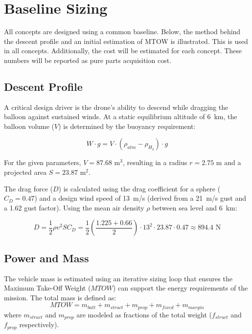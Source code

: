 \section{Baseline Sizing}

All concepts are designed using a common baseline. Below, the method behind the descent profile and an initial estimation of MTOW is illustrated. This is used in all concepts. Additionally, the cost will be estimated for each concept. These numbers will be reported as pure parts acquisition cost.
\subsection*{Descent Profile}

A critical design driver is the drone's ability to descend while dragging the balloon against sustained winds. At a static equilibrium altitude of 6~km, the balloon volume ($V$) is determined by the buoyancy requirement:

\begin{equation}
    W \cdot g = V \cdot (\rho_{atm} - \rho_{H_2}) \cdot g
\end{equation}

For the given parameters, $V = 87.68\text{ m}^3$, resulting in a radius $r = 2.75\text{ m}$ and a projected area $S = 23.87\text{ m}^2$. 

The drag force ($D$) is calculated using the drag coefficient for a sphere ($C_D = 0.47$) and a design wind speed of 13~m/s (derived from a 21~m/s gust and a 1.62 gust factor). Using the mean air density $\rho$ between sea level and 6~km:

\begin{equation}
    D = \frac{1}{2} \rho v^2 S C_D = \frac{1}{2} \left( \frac{1.225 + 0.66}{2} \right) \cdot 13^2 \cdot 23.87 \cdot 0.47 \approx 894.4\text{ N}
\end{equation}


\subsection*{Power and Mass}
\label{sec:power_mass}

The vehicle mass is estimated using an iterative sizing loop that ensures the Maximum Take-Off Weight ($MTOW$) can support the energy requirements of the mission. The total mass is defined as:
\begin{equation}
    MTOW = m_{batt} + m_{struct} + m_{prop} + m_{fixed} + m_{margin}
\end{equation}
where $m_{struct}$ and $m_{prop}$ are modeled as fractions of the total weight ($f_{struct}$ and $f_{prop}$ respectively). 


